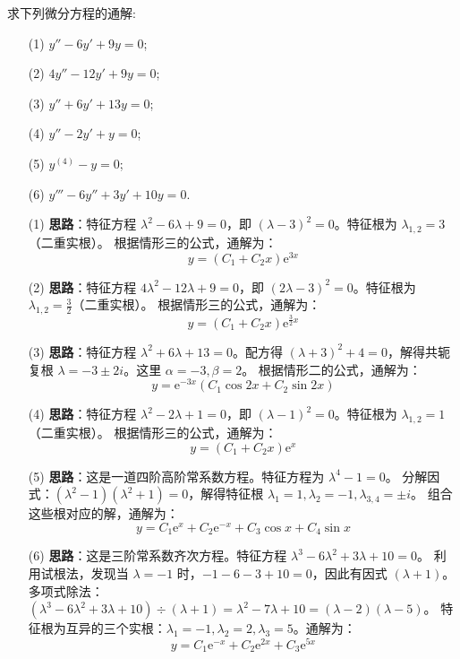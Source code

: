 \documentclass[lang=cn,11pt]{elegantbook}
\begin{document}
\begin{exercise}[齐次方程通解]
求下列微分方程的通解:
\begin{enumerate}
    \item[(1)] $y''-6y'+9y=0$;
    \item[(2)] $4y''-12y'+9y=0$;
    \item[(3)] $y''+6y'+13y=0$;
    \item[(4)] $y''-2y'+y=0$;
    \item[(5)] $y^{(4)}-y=0$;
    \item[(6)] $y'''-6y''+3y'+10y=0$.
\end{enumerate}
\end{exercise}
\begin{solution}
\begin{enumerate}
    \item[(1)] \textbf{思路}：特征方程 $\lambda^2 - 6\lambda + 9 = 0$，即 $(\lambda-3)^2 = 0$。特征根为 $\lambda_{1,2} = 3$（二重实根）。
    根据情形三的公式，通解为：
    \[
    y = (C_1 + C_2 x)\mathrm{e}^{3x}
    \]
    
    \item[(2)] \textbf{思路}：特征方程 $4\lambda^2 - 12\lambda + 9 = 0$，即 $(2\lambda-3)^2 = 0$。特征根为 $\lambda_{1,2} = \frac{3}{2}$（二重实根）。
    根据情形三的公式，通解为：
    \[
    y = (C_1 + C_2 x)\mathrm{e}^{\frac{3}{2}x}
    \]
    
    \item[(3)] \textbf{思路}：特征方程 $\lambda^2 + 6\lambda + 13 = 0$。配方得 $(\lambda+3)^2 + 4 = 0$，解得共轭复根 $\lambda = -3 \pm 2i$。这里 $\alpha = -3, \beta = 2$。
    根据情形二的公式，通解为：
    \[
    y = \mathrm{e}^{-3x}(C_1\cos 2x + C_2\sin 2x)
    \]
    
    \item[(4)] \textbf{思路}：特征方程 $\lambda^2 - 2\lambda + 1 = 0$，即 $(\lambda-1)^2 = 0$。特征根为 $\lambda_{1,2} = 1$（二重实根）。
    根据情形三的公式，通解为：
    \[
    y = (C_1 + C_2 x)\mathrm{e}^x
    \]
    
    \item[(5)] \textbf{思路}：这是一道四阶高阶常系数方程。特征方程为 $\lambda^4 - 1 = 0$。
    分解因式：$(\lambda^2 - 1)(\lambda^2 + 1) = 0$，解得特征根 $\lambda_1 = 1, \lambda_2 = -1, \lambda_{3,4} = \pm i$。
    组合这些根对应的解，通解为：
    \[
    y = C_1\mathrm{e}^x + C_2\mathrm{e}^{-x} + C_3\cos x + C_4\sin x
    \]
    
    \item[(6)] \textbf{思路}：这是三阶常系数齐次方程。特征方程 $\lambda^3 - 6\lambda^2 + 3\lambda + 10 = 0$。
    利用试根法，发现当 $\lambda = -1$ 时，$-1 - 6 - 3 + 10 = 0$，因此有因式 $(\lambda+1)$。
    多项式除法：$(\lambda^3 - 6\lambda^2 + 3\lambda + 10) \div (\lambda+1) = \lambda^2 - 7\lambda + 10 = (\lambda-2)(\lambda-5)$。
    特征根为互异的三个实根：$\lambda_1 = -1, \lambda_2 = 2, \lambda_3 = 5$。通解为：
    \[
    y = C_1\mathrm{e}^{-x} + C_2\mathrm{e}^{2x} + C_3\mathrm{e}^{5x}
    \]
\end{enumerate}
\end{solution}
\end{document}
